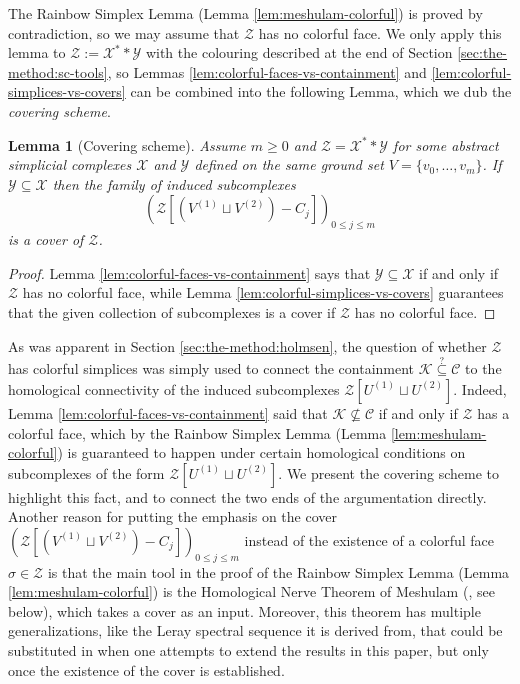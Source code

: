 \documentclass[a4paper,11pt,reqno, english]{amsart}
\newtheorem{lemma}[theorem]{Lemma}
\theoremstyle{definition}
\theoremstyle{remark}
\begin{document}
The Rainbow Simplex Lemma (Lemma \ref{lem:meshulam-colorful}) is proved by contradiction, so we may assume that $\mathscr{Z}$ has no colorful face. We only apply this lemma to $\mathscr{Z}:=\mathscr{X}^**\mathscr{Y}$ with the colouring described at the end of Section \ref{sec:the-method:sc-tools}, so Lemmas \ref{lem:colorful-faces-vs-containment} and \ref{lem:colorful-simplices-vs-covers} can be combined into the following Lemma, which we dub the \emph{covering scheme}.
\begin{lemma}[Covering scheme]
    Assume $m\geq 0$ and $\mathscr{Z}=\mathscr{X}^**\mathscr{Y}$ for some abstract simplicial complexes $\mathscr{X}$ and $\mathscr{Y}$ defined on the same ground set $V=\{v_0,\ldots,v_m\}$. If $\mathscr{Y}\subseteq \mathscr{X}$ then the family of induced subcomplexes
    \[
        (\mathscr{Z}[(V^{(1)}\sqcup V^{(2)})-C_j])_{0\leq j\leq m}
    \]
    is a cover of $\mathscr{Z}$.
\end{lemma}
\begin{proof}
    Lemma \ref{lem:colorful-faces-vs-containment} says that $\mathscr{Y}\subseteq \mathscr{X}$ if and only if $\mathscr{Z}$ has no colorful face, while Lemma \ref{lem:colorful-simplices-vs-covers} guarantees that the given collection of subcomplexes is a cover if $\mathscr{Z}$ has no colorful face.
\end{proof}
As was apparent in Section \ref{sec:the-method:holmsen}, the question of whether $\mathscr{Z}$ has colorful simplices was simply used to connect the containment $\mathscr{K}\stackrel{?}{\subseteq}\mathscr{C}$ to the homological connectivity of the induced subcomplexes $\mathscr{Z}[U^{(1)}\sqcup U^{(2)}]$. Indeed, Lemma \ref{lem:colorful-faces-vs-containment} said that $\mathscr{K}\nsubseteq\mathscr{C}$ if and only if $\mathscr{Z}$ has a colorful face, which by the Rainbow Simplex Lemma (Lemma \ref{lem:meshulam-colorful}) is guaranteed to happen under certain homological conditions on subcomplexes of the form $\mathscr{Z}[U^{(1)}\sqcup U^{(2)}]$.
We present the covering scheme to highlight this fact, and to connect the two ends of the argumentation directly. Another reason for putting the emphasis on the cover $(\mathscr{Z}[(V^{(1)}\sqcup V^{(2)})-C_j])_{0\leq j\leq m}$ instead of the existence of a colorful face $\sigma\in \mathscr{Z}$  is that the main tool in the proof of the Rainbow Simplex Lemma (Lemma \ref{lem:meshulam-colorful}) is the Homological Nerve Theorem of Meshulam (\cite[Theorem 2.1]{Meshulam2001}, see below), which takes a cover as an input. Moreover, this theorem has multiple generalizations, like the Leray spectral sequence it is derived from, that could be substituted in when one attempts to extend the results in this paper, but only once the existence of the cover is established.
\end{document}
